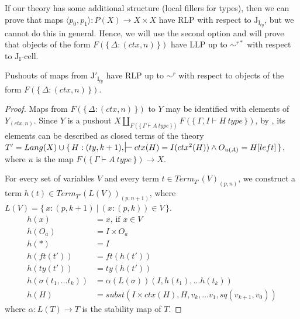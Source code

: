 \documentclass[reqno]{amsart}
\theoremstyle{definition}
\theoremstyle{remark}
\newcommand{\emptyCtx}{*}
\newcommand{\I}{\mathrm{I}}
\newcommand{\J}{\mathrm{J}}
\newcommand{\class}[2]{#1\text{-}\mathrm{#2}}
\newcommand{\Icell}[1][\I]{\class{#1}{cell}}
\newcommand{\Jcell}[1][]{\Icell[\J#1]}
\numberwithin{figure}{section}
\begin{document}
If our theory has some additional structure (local fillers for types),
then we can prove that maps $\langle p_0, p_1 \rangle : P(X) \to X \times X$ have RLP with respect to $\J_{\I_{ty}}$, but we cannot do this in general.
Hence, we will use the second option and will prove that objects of the form $F(\{\,\Delta : (ctx,n)\,\})$ have LLP up to $\sim^{r*}$ with respect to $\Jcell[_\I]$.

\begin{lem}[Jty]
Pushouts of maps from $\J'_{\I_{ty}}$ have RLP up to $\sim^r$ with respect to objects of the form $F(\{\,\Delta : (ctx,n)\,\})$.
\end{lem}
\begin{proof}
Maps from $F(\{\,\Delta : (ctx,n)\,\})$ to $Y$ may be identified with elements of $Y_{(ctx,n)}$.
Since $Y$ is a pushout $X \amalg_{F(\{\,\Gamma \vdash A\ type\,\})} F(\{\,\Gamma, I \vdash H\ type\,\})$,
by , its elements can be described as closed terms of the theory
$T' = Lang(X) \cup \{\,H : (ty,k+1), \sststile{}{} ctx(H) = I(ctx^2(H)) \land O_{u(A)} = H[left]\,\}$,
where $u$ is the map $F(\{\,\Gamma \vdash A\ type\,\}) \to X$.

For every set of variables $V$ and every term $t \in Term_{T'}(V)_{(p,n)}$,
we construct a term $h(t) \in Term_{T'}(L(V))_{(p,n+1)}$, where $L(V) = \{\,x : (p,k+1)\ |\ (x : (p,k)) \in V\,\}$.
\begin{align*}
h(x) & = x \text{, if } x \in V \\
h(O_a) & = I \times O_a \\
h(\emptyCtx) & = I \\
h(ft(t')) & = ft(h(t')) \\
h(ty(t')) & = ty(h(t')) \\
h(\sigma(t_1, \ldots t_k)) & = \alpha(L(\sigma))(I, h(t_1), \ldots h(t_k)) \\
h(H) & = subst(I \times ctx(H), H, v_k, \ldots v_1, sq(v_{k+1}, v_0))
\end{align*}
where $\alpha : L(T) \to T$ is the stability map of $T$.


\end{proof}
\end{document}
